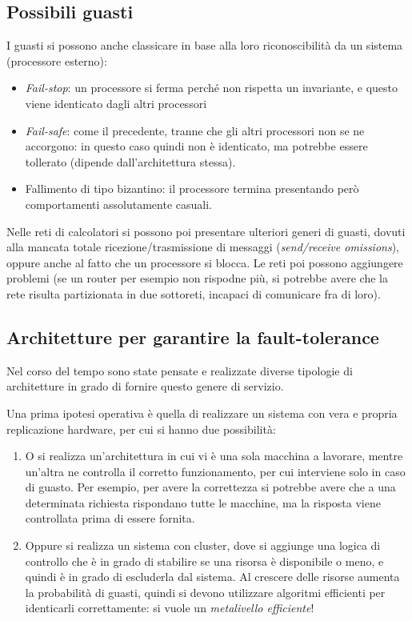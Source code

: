 \subsection{Possibili guasti}
I guasti si possono anche classicare in base alla loro riconoscibilità da un sistema (processore esterno):
\begin{itemize}
 \item \textit{Fail-stop}: un processore si ferma perché non rispetta un invariante, e questo viene identicato dagli
 altri processori
 \item \textit{Fail-safe}: come il precedente, tranne che gli altri processori non se ne accorgono: in questo caso
 quindi non è identicato, ma potrebbe essere tollerato (dipende dall'architettura stessa).
 \item Fallimento di tipo bizantino: il processore termina presentando però comportamenti assolutamente casuali.
\end{itemize}
Nelle reti di calcolatori si possono poi presentare ulteriori generi di guasti, dovuti alla mancata totale
ricezione/trasmissione di messaggi (\textit{send/receive omissions}), oppure anche al fatto che un processore si 
blocca. Le reti poi possono aggiungere problemi (se un router per esempio non rispodne più, si potrebbe avere che la
rete risulta partizionata in due sottoreti, incapaci di comunicare fra di loro).
\subsection{Architetture per garantire la fault-tolerance}
Nel corso del tempo sono state pensate e realizzate diverse tipologie di architetture in grado di fornire questo genere
di servizio.

Una prima ipotesi operativa è quella di realizzare un sistema con vera e propria replicazione hardware, per cui si 
hanno due possibilità:
\begin{enumerate}
 \item O si realizza un'architettura in cui vi è una sola macchina a lavorare, mentre un'altra ne controlla il corretto
 funzionamento, per cui interviene solo in caso di guasto. Per esempio, per avere la correttezza si potrebbe
 avere che a una determinata richiesta rispondano tutte le macchine, ma la risposta viene controllata prima di essere
 fornita.
 \item Oppure si realizza un sistema con cluster, dove si aggiunge una logica di controllo che è in grado di stabilire
  se una risorsa è disponibile o meno, e quindi è in grado di escluderla dal sistema. Al crescere delle risorse
  aumenta la probabilità di guasti, quindi si devono utilizzare algoritmi efficienti per identicarli correttamente: si
  vuole un \textit{metalivello efficiente}!
\end{enumerate}

